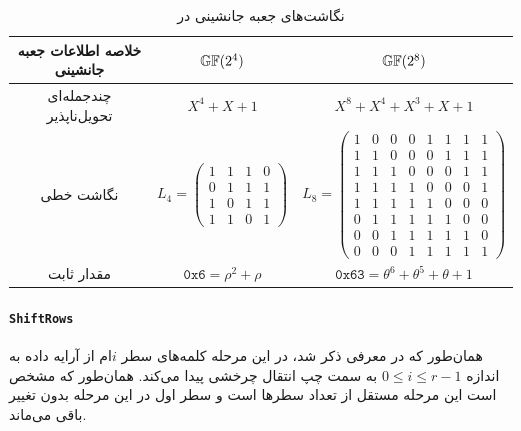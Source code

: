 \begin{table}[h]
\begin{center}
\begin{tabular}{|c||c|c|}
	\hline 
	خلاصه اطلاعات جعبه جانشینی & $\mathbb{GF}(2^{4})$ & $\mathbb{GF}(2^{8})$ \\ 
	\hline 
	\hline
	چندجمله‌ای تحویل‌ناپذیر & $X^{4} + X + 1$ & $X^{8} + X^{4} + X^{3} + X + 1$ \\ 
	\hline 
	نگاشت خطی & 
$
L_{4} = \begin{pmatrix}
1 & 1 & 1 & 0\\
0 & 1 & 1 & 1\\
1 & 0 & 1 & 1\\
1 & 1 & 0 & 1
\end{pmatrix} 
$&  
$
L_{8} = \begin{pmatrix}
1&0&0&0&1&1&1&1\\
1&1&0&0&0&1&1&1\\
1&1&1&0&0&0&1&1\\
1&1&1&1&0&0&0&1\\
1&1&1&1&1&0&0&0\\
0&1&1&1&1&1&0&0\\
0&0&1&1&1&1&1&0\\
0&0&0&1&1&1&1&1
\end{pmatrix} 
$\\ 
	\hline 
	مقدار ثابت & 
	$\texttt{0x6} = \rho^{2} + \rho$ & $\texttt{0x63} = \theta^{6} + \theta^{5} + \theta + 1$ \\ 
	\hline 
\end{tabular} 
\caption{نگاشت‌های جعبه جانشینی در 
	}
\label{tab:summary_of_sr_sbox}
\end{center}
\end{table}

\paragraph*{\texttt{ShiftRows}}
 همان‌طور که در معرفی 
ذکر شد، در این مرحله کلمه‌های  سطر 
$i$ام 
از آرایه داده به اندازه 
$0\leq i\leq r-1$
به سمت چپ انتقال چرخشی پیدا می‌کند. همان‌طور که مشخص است این مرحله مستقل از تعداد سطرها است و سطر اول در این مرحله بدون تغییر باقی می‌ماند. 

